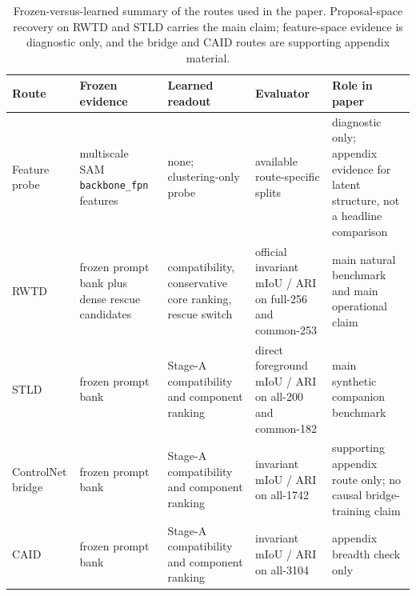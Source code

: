 \begin{table}[t]
\centering
\scriptsize
\setlength{\tabcolsep}{4pt}
\renewcommand{\arraystretch}{0.98}
\begin{tabularx}{\textwidth}{@{}p{}p{}p{}p{}X@{}}
\toprule
Route & Frozen evidence & Learned readout & Evaluator & Role in paper \\
\midrule
Feature probe & multiscale SAM \texttt{backbone\_fpn} features & none; clustering-only probe & available route-specific splits & diagnostic only; appendix evidence for latent structure, not a headline comparison \\
RWTD & frozen prompt bank plus dense rescue candidates & compatibility, conservative core ranking, rescue switch & official invariant mIoU / ARI on full-256 and common-253 & main natural benchmark and main operational claim \\
STLD & frozen prompt bank & Stage-A compatibility and component ranking & direct foreground mIoU / ARI on all-200 and common-182 & main synthetic companion benchmark \\
ControlNet bridge & frozen prompt bank & Stage-A compatibility and component ranking & invariant mIoU / ARI on all-1742 & supporting appendix route only; no causal bridge-training claim \\
CAID & frozen prompt bank & Stage-A compatibility and component ranking & invariant mIoU / ARI on all-3104 & appendix breadth check only \\
\bottomrule
\end{tabularx}
\caption{Frozen-versus-learned summary of the routes used in the paper. Proposal-space recovery on RWTD and STLD carries the main claim; feature-space evidence is diagnostic only, and the bridge and CAID routes are supporting appendix material.}
\label{tab:route_protocol}
\end{table}
